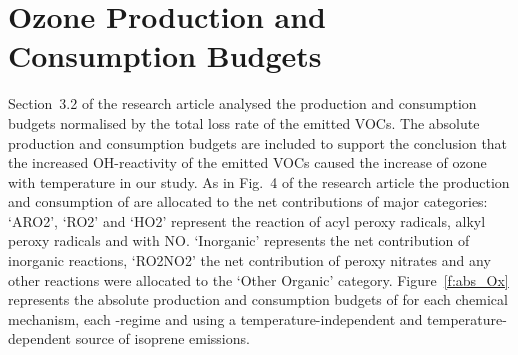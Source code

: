 \documentclass[11pt,a4paper]{article}
\begin{document}
\section{Ozone Production and Consumption Budgets}
\vspace{-2mm}
Section~3.2 of the research article analysed the  production and consumption budgets normalised by the total loss rate of the emitted VOCs. 
The absolute  production and consumption budgets are included to support the conclusion that the increased OH-reactivity of the emitted VOCs caused the increase of ozone with temperature in our study.
As in Fig.~4 of the research article the production and consumption of  are allocated to the net contributions of major categories: `ARO2', `RO2' and `HO2' represent the reaction of acyl peroxy radicals, alkyl peroxy radicals and  with NO.
`Inorganic' represents the net contribution of inorganic reactions, `RO2NO2' the net contribution of peroxy nitrates and any other reactions were allocated to the `Other Organic' category.
Figure~\ref{f:abs_Ox} represents the absolute production and consumption budgets of  for each chemical mechanism, each -regime and using a temperature-independent and temperature-dependent source of isoprene emissions.
\end{document}
